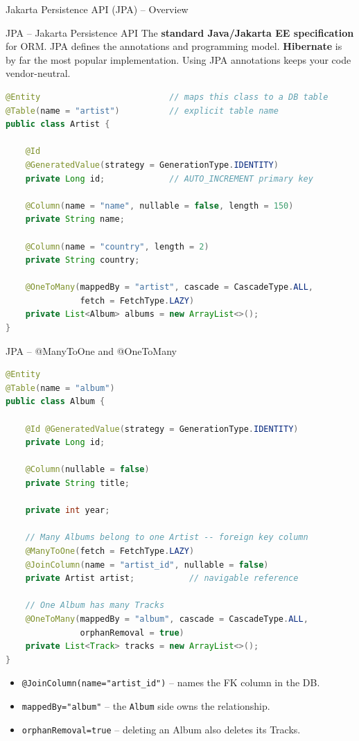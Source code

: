 \begin{frame}[fragile]{Jakarta Persistence API (JPA) -- Overview}
  \begin{block}{JPA -- Jakarta Persistence API}
    The \textbf{standard Java/Jakarta EE specification} for ORM.
    JPA defines the annotations and programming model.
    \textbf{Hibernate} is by far the most popular implementation.
    Using JPA annotations keeps your code vendor-neutral.
  \end{block}

  \begin{lstlisting}[style=sqlstyle, language=Java]
@Entity                          // maps this class to a DB table
@Table(name = "artist")          // explicit table name
public class Artist {

    @Id
    @GeneratedValue(strategy = GenerationType.IDENTITY)
    private Long id;             // AUTO_INCREMENT primary key

    @Column(name = "name", nullable = false, length = 150)
    private String name;

    @Column(name = "country", length = 2)
    private String country;

    @OneToMany(mappedBy = "artist", cascade = CascadeType.ALL,
               fetch = FetchType.LAZY)
    private List<Album> albums = new ArrayList<>();
}
  \end{lstlisting}
\end{frame}

\begin{frame}[fragile]{JPA -- @ManyToOne and @OneToMany}
  \begin{lstlisting}[style=sqlstyle, language=Java]
@Entity
@Table(name = "album")
public class Album {

    @Id @GeneratedValue(strategy = GenerationType.IDENTITY)
    private Long id;

    @Column(nullable = false)
    private String title;

    private int year;

    // Many Albums belong to one Artist -- foreign key column
    @ManyToOne(fetch = FetchType.LAZY)
    @JoinColumn(name = "artist_id", nullable = false)
    private Artist artist;           // navigable reference

    // One Album has many Tracks
    @OneToMany(mappedBy = "album", cascade = CascadeType.ALL,
               orphanRemoval = true)
    private List<Track> tracks = new ArrayList<>();
}
  \end{lstlisting}

  \begin{itemize}
    \item \texttt{@JoinColumn(name="artist\_id")} -- names the FK column in the DB.
    \item \texttt{mappedBy="album"} -- the \texttt{Album} side owns the relationship.
    \item \texttt{orphanRemoval=true} -- deleting an Album also deletes its Tracks.
  \end{itemize}
\end{frame}

